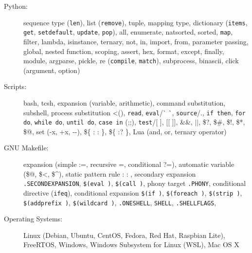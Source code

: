 \documentclass[letterpaper,11pt]{article}
\begin{document}
\begin{description}
\item[Python:] sequence type ({\tt len}), list ({\tt remove}), tuple, mapping type,
dictionary ({\tt items}, {\tt get}, {\tt setdefault}, {\tt update}, {\tt pop}),
all,
enumerate, natsorted, sorted, {\tt map}, filter, lambda, isinstance, ternary, not, in, import, from, parameter passing,
global, nested function, scoping, assert, hex, format,
except, finally, module, argparse, pickle, re ({\tt compile}, {\tt match}), subprocess, binascii, click (argument, option)

\item[Scripts:] bash, tcsh, expansion (variable, arithmetic), command substitution, subshell, process substitution \textless(), {\tt read},
{\tt eval}/\`{} \`{}, {\tt source}/.,
{\tt if then}, {\tt for do}, {\tt while do}, {\tt until do}, {\tt case in} (;;), {\tt test}/[ ], [[ ]], \&\&, $||$, \$?, \$\#, \$!, \$*, \$@,
set (-x, +x, -{}-),
\$\{ : : \}, \$\{ :? \},
Lua (and, or, ternary operator)

\item[GNU Makefile:] expansion (simple :=, recursive =, conditional ?=), automatic variable (\$@, \$\textless, \$\^{}),
static pattern rule : : , secondary expansion {\tt .SECONDEXPANSION},
{\tt \$(eval )}, {\tt \$(call )},
phony target {\tt .PHONY},
conditional directive ({\tt ifeq}), conditional expansion {\tt \$(if )}, {\tt \$(foreach )}, {\tt \$(strip )}, {\tt \$(addprefix )},
{\tt \$(wildcard )},
{\tt .ONESHELL}, {\tt SHELL}, {\tt .SHELLFLAGS},


\item[Operating Systems:] Linux (Debian, Ubuntu, CentOS, Fedora, Red Hat, Raspbian Lite), FreeRTOS, Windows, Windows Subsystem for Linux (WSL), Mac OS X


\end{description}
\end{document}
